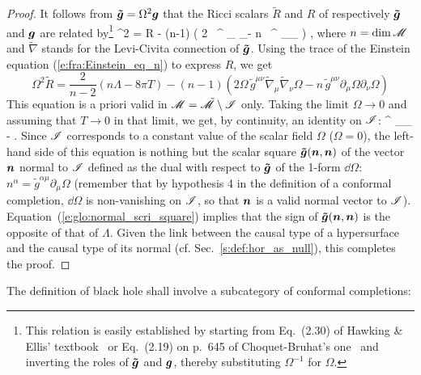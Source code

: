 \begin{proof}
It follows from $\bm{\tilde{g}} = \Omega^2 \bm{g}$ that the Ricci scalars $\tilde{R}$
and $R$ of respectively $\bm{\tilde{g}}$ and $\bm{g}$ are related by\footnote{This relation is
easily established by starting from Eq.~(2.30) of Hawking \& Ellis' textbook~\cite{HawkiE73} or Eq.~(2.19) on p.~645 of Choquet-Bruhat's one~\cite{Choqu09} and inverting the roles of $\bm{\tilde{g}}$ and $\bm{g}$, thereby substituting
$\Omega^{-1}$ for $\Omega$.}
\be \label{e:glo:tildeR_R}
    \Omega^2  = R - (n-1) \left( 2 \Omega \, ^{\mu\nu} \tilde{\nabla}_\mu
    \tilde{\nabla}_\nu \Omega - n \, ^{\mu\nu} \partial_\mu \Omega \partial_\nu \Omega
    \right) ,
\ee
where $n = \mathrm{dim}\, \mathscr{M}$ and $\tilde{\nabla}$ stands for the Levi-Civita connection of
$\bm{\tilde{g}}$. Using the trace of the Einstein equation (\ref{e:fra:Einstein_eq_n}) to
express $R$, we get
\[
    \Omega^2 \tilde{R} = \frac{2}{n-2}\left( n \Lambda - 8\pi T \right)
     - (n-1) \left( 2 \Omega \, \tilde{g}^{\mu\nu} \tilde{\nabla}_\mu
    \tilde{\nabla}_\nu \Omega - n \, \tilde{g}^{\mu\nu} \partial_\mu \Omega \partial_\nu \Omega
    \right)
\]
This equation is a priori valid in $\mathscr{M} = \tilde{\mathscr{M}}\setminus\mathscr{I}$ only.
Taking the limit $\Omega\rightarrow 0$ and
assuming that $T\rightarrow 0$ in that limit, we get, by continuity, an identity
on $\mathscr{I}$:
\be \label{e:glo:normal_scri_square}
^{\mu\nu} \partial_\mu \Omega \partial_\nu \Omega \stackrel{\scri}{=}
    -  \Lambda .
\ee
Since $\mathscr{I}$ corresponds to a constant value of the scalar field $\Omega$ ($\Omega=0$),
the left-hand side of this equation is nothing but the scalar square
$\bm{\tilde{g}}(\bm{n},\bm{n})$ of the vector $\bm{n}$ normal to $\mathscr{I}$
defined as the dual with respect to $\bm{\tilde{g}}$ of the 1-form
$\dd\Omega$: $n^\alpha = \tilde{g}^{\alpha\mu} \partial_\mu \Omega$
(remember that by hypothesis 4 in the definition
of a conformal completion, $\dd\Omega$ is non-vanishing on $\mathscr{I}$, so that
$\bm{n}$  is a valid normal
vector to $\mathscr{I}$). Equation~(\ref{e:glo:normal_scri_square}) implies
that the sign of $\bm{\tilde{g}}(\bm{n},\bm{n})$ is the opposite of that of $\Lambda$.
Given the link between the causal type of a hypersurface and the causal type of its normal
(cf. Sec.~\ref{s:def:hor_as_null}), this completes the proof.
\end{proof}

The definition of black hole shall involve a subcategory of conformal completions:

